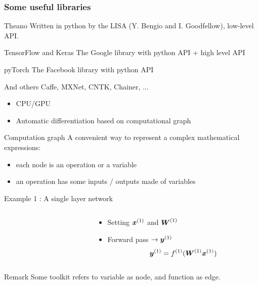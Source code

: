 \begin{frame}
  \frametitle{Some useful libraries}
  \begin{block}{Theano}
    Written in python by the LISA (Y. Bengio and I. Goodfellow),
    low-level API.
  \end{block}
  \begin{block}{TensorFlow and Keras}
    The Google library with python API + high level API
  \end{block}
  \begin{block}{pyTorch}
    The Facebook library with python API 
  \end{block}
  \begin{block}{And others}
    Caffe, MXNet, CNTK, Chainer, ...
  \end{block}
  \begin{itemize}
  \item CPU/GPU
  \item Automatic differentiation based on computational graph
  \end{itemize}
\end{frame}


\begin{frame}{Computation graph}
  A convenient way to represent  a  complex mathematical expressions: 
  \begin{itemize}
  \item  each node is an operation or a variable
  \item an operation has some inputs / outputs made of variables
  \end{itemize}
  \begin{block}{Example 1 : A single  layer network}
    \begin{columns}
      \begin{column}{0.5\textwidth}
      \end{column}
      \begin{column}{0.5\textwidth}
        \begin{itemize}
        \item Setting $\boldsymbol{x}^{(1)}$ and $\boldsymbol{W}^{(1)}$
        \item Forward pass $\rightarrow \boldsymbol{y}^{(1)}$
        $$ 
        \boldsymbol{y}^{(1)} = f^{(1)}(\boldsymbol{W}^{(1)}\boldsymbol{x}^{(1)})
        $$
        \end{itemize}
      \end{column}
    \end{columns}
  \end{block}
  \begin{block}{Remark}
    Some toolkit refers to variable as node, and function as edge. 
  \end{block}
\end{frame}


